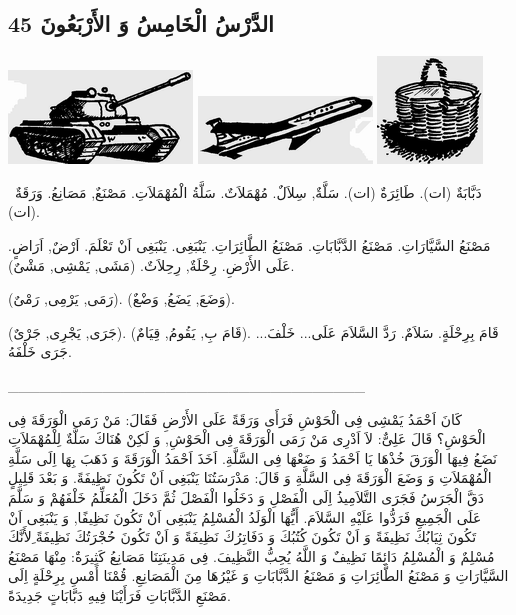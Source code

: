 \documentclass[a5paper]{article}
\begin{document}
\subsection{الدَّرْسُ الْخَامِسُ وَ الأَرْبَعُونَ 45}
 \includegraphics[width=1.9272in,height=0.9791in]{MuhammadBagauddinlatinized-img142.png}  \includegraphics[width=1.8228in,height=0.7083in]{MuhammadBagauddinlatinized-img143.png}   \includegraphics[width=1.1043in,height=1.1252in]{MuhammadBagauddinlatinized-img144.png} 

\ دَبَّابَةٌ (ات). طَائِرَةٌ (ات). سَلَّةٌ, سِلاَلٌ. مُهْمَلاَتٌ. سَلَّةُ الْمُهْمَلاَتِ. مَصْنَعٌ, مَصَانِعُ. وَرَقَةٌ (ات). 

مَصْنَعُ السَّيَّارَاتِ. مَصْنَعُ الدَّبَّابَاتِ. مَصْنَعُ الطَّائِرَاتِ. يَنْبَغِى. يَنْبَغِى اَنْ تَعْلَمَ. اَرْضٌ, اَرَاضٍ. عَلَى الأَرْضِ. رِحْلَةٌ, رِحِلاَتٌ. (مَشَى, يَمْشِى, مَشْىٌ). 

(رَمَى, يَرْمِى, رَمْىٌ). (وَضَعَ, يَضَعُ, وَضْعٌ).

(جَرَى, يَجْرِى, جَرْىٌ). (قَامَ بِ, يَقُومُ, قِيَامٌ). قَامَ بِرِحْلَةٍ. سَلاَمٌ. رَدَّ السَّلاَمَ عَلَى... خَلْفَ... جَرَى خَلْفَهُ.

\_\_\_\_\_\_\_\_\_\_\_\_\_\_\_\_\_\_\_\_\_\_\_\_\_\_\_\_\_\_\_\_\_\_

كَانَ اَحْمَدُ يَمْشِى فِى الْحَوْشِ فَرَأَى وَرَقَةً عَلَى الأَرْضِ فَقَالَ: مَنْ رَمَى الْوَرَقَةَ فِى الْحَوْشِ؟ قَالَ عَلِىٌّ: لاَ اَدْرِى مَنْ رَمَى الْوَرَقَةَ فِى الْحَوْشِ, وَ لَكِنْ هُنَاكَ سَلَّةٌ لِلْمُهْمَلاَتِ نَضَعُ فِيهَا الْوَرَقَ خُذْهَا يَا اَحْمَدُ وَ ضَعْهَا فِى السَّلَّةِ. اَخَذَ اَحْمَدُ الْوَرَقَةَ وَ ذَهَبَ بِهَا اِلَى سَلَّةِ الْمُهْمَلاَتِ وَ وَضَعَ الْوَرَقَةَ فِى السَّلَّةِ وَ قَالَ: مَدْرَسَتُنَا يَنْبَغِى اَنْ تَكُونَ نَظِيفَةً. وَ بَعْدَ قَلِيلٍ دَقَّ الْجَرَسُ فَجَرَى التَّلاَمِيذُ اِلَى الْفَصْلِ وَ دَخَلُوا الْفَصْلَ ثُمَّ دَخَلَ الْمُعَلِّمُ خَلْفَهُمْ وَ سَلَّمَ عَلَى الْجَمِيعِ فَرَدُّوا عَلَيْهِ السَّلاَمَ. أَيُّهَا الْوَلَدُ الْمُسْلِمُ يَنْبَغِى اَنْ تَكُونَ نَظِيفًا, وَ يَنْبَغِى اَنْ تَكُونَ ثِيَابُكَ نَظِيفَةً وَ اَنْ تَكُونَ كُتُبُكَ وَ دَفَاتِرُكَ نَظِيفَةً وَ اَنْ تَكُونَ حُجْرَتُكَ نَظِيفَةً ِلأَنَّكَ مُسْلِمٌ وَ الْمُسْلِمُ دَائِمًا نَظِيفٌ وَ اللَّهُ يُحِبُّ النَّظِيفَ. فِى مَدِينَتِنَا مَصَانِعُ كَثِيرَةٌ: مِنْهَا مَصْنَعُ السَّيَّارَاتِ وَ مَصْنَعُ الطَّائِرَاتِ وَ مَصْنَعُ الدَّبَّابَاتِ وَ غَيْرُهَا مِنَ الْمَصَانِعِ. قُمْنَا أَمْسِ بِرِحْلَةٍ اِلَى مَصْنَعِ الدَّبَّابَاتِ فَرَأَيْنَا فِيهِ دَبَّابَاتٍ جَدِيدَةً.
\end{document}
